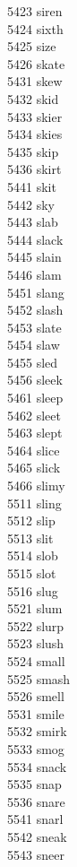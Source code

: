 5423 siren \\
5424 sixth \\
5425 size \\
5426 skate \\
5431 skew \\
5432 skid \\
5433 skier \\
5434 skies \\
5435 skip \\
5436 skirt \\
5441 skit \\
5442 sky \\
5443 slab \\
5444 slack \\
5445 slain \\
5446 slam \\
5451 slang \\
5452 slash \\
5453 slate \\
5454 slaw \\
5455 sled \\
5456 sleek \\
5461 sleep \\
5462 sleet \\
5463 slept \\
5464 slice \\
5465 slick \\
5466 slimy \\
5511 sling \\
5512 slip \\
5513 slit \\
5514 slob \\
5515 slot \\
5516 slug \\
5521 slum \\
5522 slurp \\
5523 slush \\
5524 small \\
5525 smash \\
5526 smell \\
5531 smile \\
5532 smirk \\
5533 smog \\
5534 snack \\
5535 snap \\
5536 snare \\
5541 snarl \\
5542 sneak \\
5543 sneer \\
